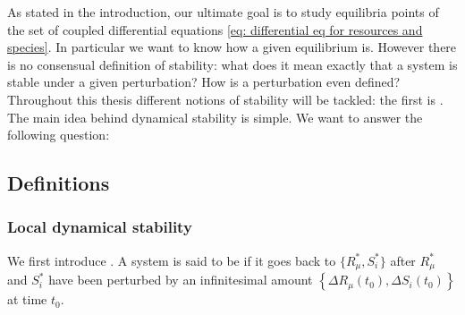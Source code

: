 \documentclass[12pt, titlepage]{report}
\begin{document}
As stated in the introduction, %
our ultimate goal is to study equilibria points of the set of coupled differential equations \eqref{eq: differential eq for resources and species}. In particular we want to know how  a given equilibrium is. However there is no consensual definition of stability: what does it mean exactly that a system is stable under a given perturbation? How is a perturbation even defined? %
Throughout this thesis different notions of stability will be tackled: the first is .
The main idea behind dynamical stability is simple. We want to answer the following question:

\begin{centering}
\end{centering}
\subsection{Definitions}
\subsubsection{Local dynamical stability}
We first introduce . A system is said to be  if it goes back to  $\{ R^*_\mu, S^*_i \} $ after $R^*_\mu$ and $S^*_i$ have been perturbed by an infinitesimal amount $\left\{ \Delta R_\mu(t_0), \Delta S_i(t_0) \right\}$ at time $t_0$.
\end{document}
